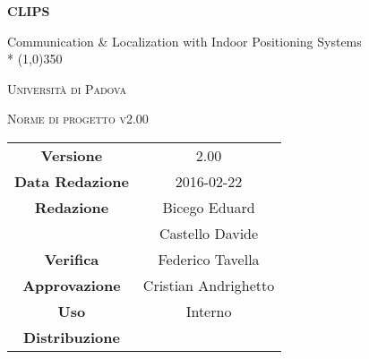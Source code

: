 \documentclass[a4paper,12pt]{article}
\author{Conti Oscar Elia, Zanella Marco}
\date{18/02/2016}
\begin{document}
\begin{titlepage}
	\centering
	{\huge\bfseries CLIPS\par}
	Communication \& Localization with Indoor Positioning Systems \\*
	\line(1,0){350} \\
	{\scshape\LARGE Università di Padova \par}
	\vspace{1cm}
	{\scshape\Large Norme di progetto v2.00 \par}
	\logo
	\newpage
		\begin{tabular}{c|c}
			{\hfill \textbf{Versione}} 			& 2.00					    \\
			{\hfill\textbf{Data Redazione}} 	& 2016-02-22		 	    \\ 
			{\hfill\textbf{Redazione}} 			&  Bicego Eduard			\\ 
												&  Castello Davide			\\
			{\hfill\textbf{Verifica}} 			&  Federico Tavella			\\
			{\hfill\textbf{Approvazione}} 		&  Cristian Andrighetto		\\
			{\hfill\textbf{Uso}} 				&  Interno					\\
			{\hfill\textbf{Distribuzione}} 		&  \leaf					\\
		\end{tabular}
	\end{titlepage}
	\newpage
	\pagestyle{myfront}
	
		\newpage
			\tableofcontents
		\newpage
			\listoffigures	
	\label{LastFrontPage}
	\newpage
	\pagestyle{mymain}
         
    \newpage
		

	\newpage
		
	
	\newpage
		
	
	\newpage
		
		
	\label{LastPage}
\end{document}
